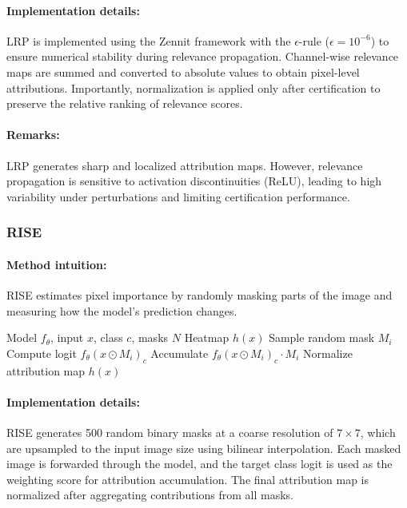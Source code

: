 \documentclass[11pt]{article}
\begin{document}
\paragraph{Implementation details:}
LRP is implemented using the Zennit framework with the $\epsilon$-rule ($\epsilon = 10^{-6}$) to ensure numerical stability during relevance propagation. Channel-wise relevance maps are summed and converted to absolute values to obtain pixel-level attributions. Importantly, normalization is applied only after certification to preserve the relative ranking of relevance scores.

\paragraph{Remarks:}
LRP generates sharp and localized attribution maps. However, relevance propagation is sensitive to activation discontinuities (ReLU), leading to high variability under perturbations and limiting certification performance.

\subsubsection{RISE}

\paragraph{Method intuition:}
RISE estimates pixel importance by randomly masking parts of the image and measuring how the model’s prediction changes.

\begin{algorithm}[H]
\caption{RISE}
\label{alg:rise}
\begin{algorithmic}[1]
\REQUIRE Model $f_\theta$, input $x$, class $c$, masks $N$
\ENSURE Heatmap $h(x)$
    \STATE Sample random mask $M_i$
    \STATE Compute logit $f_\theta(x \odot M_i)_c$
    \STATE Accumulate $f_\theta(x \odot M_i)_c \cdot M_i$
\ENDFOR
\STATE Normalize attribution map
\RETURN $h(x)$
\end{algorithmic}
\end{algorithm}

\paragraph{Implementation details:}
RISE generates 500 random binary masks at a coarse resolution of $7 \times 7$, which are upsampled to the input image size using bilinear interpolation. Each masked image is forwarded through the model, and the target class logit is used as the weighting score for attribution accumulation. The final attribution map is normalized after aggregating contributions from all masks.
\end{document}

